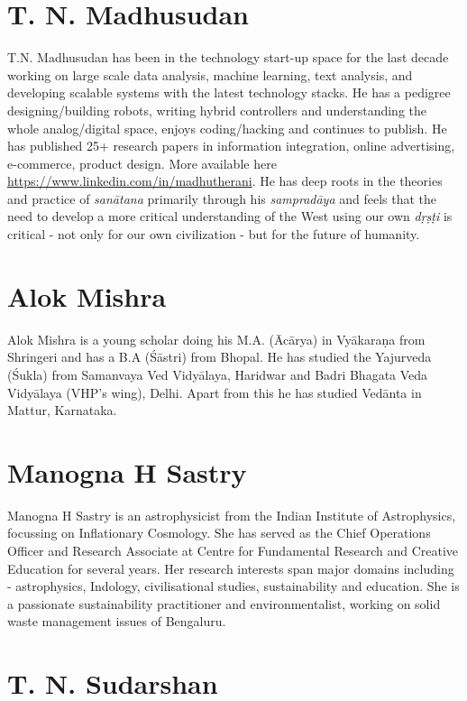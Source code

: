 \section*{T. N. Madhusudan}

T.N. Madhusudan has been in the technology start-up space for the last decade working on large scale data analysis, machine learning, text analysis, and developing scalable systems with the latest technology stacks. He has a pedigree designing/building robots, writing hybrid controllers and understanding the whole analog/digital space, enjoys coding/hacking and continues to publish. He has published 25+ research papers in information integration, online advertising, e-commerce, product design. More available here \url{https://www.linkedin.com/in/madhutherani}. He has deep roots in the theories and practice of \textit{sanātana} primarily through his \textit{sampradāya} and feels that the need to develop a more critical understanding of the West using our own \textit{dṛṣṭi} is critical - not only for our own civilization - but for the future of humanity.

\section*{Alok Mishra}

Alok Mishra is a young scholar doing his M.A. (Ācārya) in Vyākaraṇa from Shringeri and has a B.A (Śāstri) from Bhopal. He has studied the Yajurveda (Śukla) from Samanvaya Ved Vidyālaya, Haridwar and Badri Bhagata Veda Vidyālaya (VHP’s wing), Delhi. Apart from this he has studied Vedānta in Mattur, Karnataka.

\section*{Manogna H Sastry}

Manogna H Sastry is an astrophysicist from the Indian Institute of Astrophysics, focussing on Inflationary Cosmology. She has served as the Chief Operations Officer and Research Associate at Centre for Fundamental Research and Creative Education for several years. Her research interests span major domains including - astrophysics, Indology, civilisational studies, sustainability and education. She is a passionate sustainability practitioner and environmentalist, working on solid waste management issues of Bengaluru.

\section*{T. N. Sudarshan}

